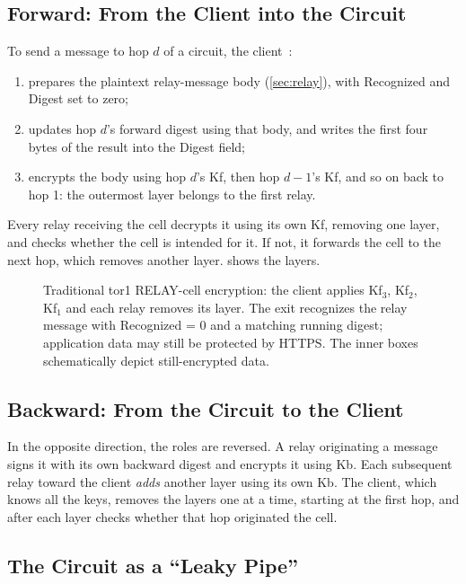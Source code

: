 \subsection{Forward: From the Client into the Circuit}

To send a message to hop $d$ of a circuit, the client~:
\begin{enumerate}
  \item prepares the plaintext relay-message body (\cref{sec:relay}), with Recognized and Digest set to zero;
  \item updates hop $d$'s forward digest using that body, and writes the first four bytes of the result into the Digest field;
  \item encrypts the body using hop $d$'s Kf, then hop $d-1$'s Kf, and so on back to hop 1: the outermost layer belongs to the first relay.
\end{enumerate}
Every relay receiving the cell decrypts it using its own Kf, removing one layer, and checks whether the cell is intended for it. If not, it forwards the cell to the next hop, which removes another layer.  shows the layers.

\begin{figure}[htbp]
\centering

\caption{Traditional tor1 RELAY-cell encryption: the client applies Kf$_3$, Kf$_2$, Kf$_1$ and each relay removes its layer. The exit recognizes the relay message with Recognized = 0 and a matching running digest; application data may still be protected by HTTPS. The inner boxes schematically depict still-encrypted data.}
\label{fig:cipolla}
\end{figure}

\subsection{Backward: From the Circuit to the Client}

In the opposite direction, the roles are reversed. A relay originating a message signs it with its own backward digest and encrypts it using Kb. Each subsequent relay toward the client \emph{adds} another layer using its own Kb. The client, which knows all the keys, removes the layers one at a time, starting at the first hop, and after each layer checks whether that hop originated the cell.

\subsection{The Circuit as a \enquote{Leaky Pipe}}

